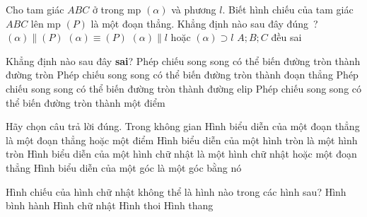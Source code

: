 \begin{ex}%
Cho tam giác $ABC$ ở trong mp $(\alpha)$ và phương $l$. Biết hình chiếu của tam giác $ABC$ lên mp $(P)$ là một đoạn thẳng. Khẳng định nào sau đây đúng ?
\choice
{$(\alpha)\parallel (P)$}
{$(\alpha)\equiv (P)$}
{\True $(\alpha)\parallel l$ hoặc $(\alpha)\supset l$}
{$A;B;C$ đều sai}
\end{ex}

\begin{ex}%
Khẳng định nào sau đây \textbf{sai}?
\choice
{Phép chiếu song song có thể biến đường tròn thành đường tròn}
{Phép chiếu song song có thể biến đường tròn thành đoạn thẳng}
{Phép chiếu song song có thể biến đường tròn thành đường elip}
{\True Phép chiếu song song có thể biến đường tròn thành một điểm}
\end{ex}

\begin{ex}%
Hãy chọn câu trả lời đúng. Trong không gian
\choice
{Hình biểu diễn của một đoạn thẳng là một đoạn thẳng hoặc một điểm}
{\True Hình biểu diễn của một hình tròn là một hình tròn}
{Hình biểu diễn của một hình chữ nhật là một hình chữ nhật hoặc một đoạn thẳng}
{Hình biểu diễn của một góc là một góc bằng nó}
	\loigiai{
		
	}
\end{ex}

\begin{ex}%
Hình chiếu của hình chữ nhật không thể là hình nào trong các hình sau?
\choice
{Hình bình hành}
{Hình chữ nhật}
{Hình thoi}
{\True Hình thang}
\end{ex}

